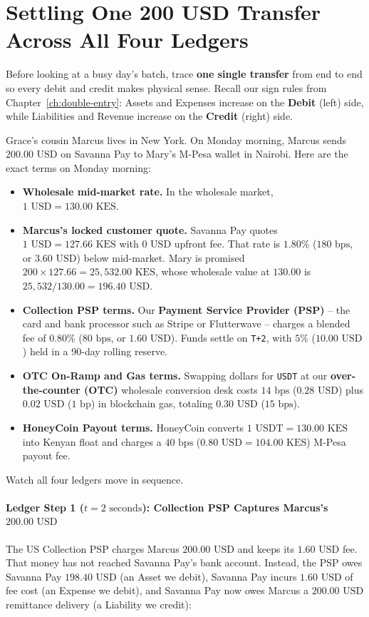 \section{Settling One 200 USD Transfer Across All Four Ledgers}

Before looking at a busy day's batch, trace \textbf{one single transfer} from end to end so every debit and credit makes physical sense. Recall our sign rules from Chapter~\ref{ch:double-entry}: Assets and Expenses increase on the \textbf{Debit} (left) side, while Liabilities and Revenue increase on the \textbf{Credit} (right) side.

Grace's cousin Marcus lives in New York. On Monday morning, Marcus sends $200.00\text{ USD}$ on Savanna Pay to Mary's M-Pesa wallet in Nairobi. Here are the exact terms on Monday morning:
\begin{itemize}
  \item \textbf{Wholesale mid-market rate.} In the wholesale market, $1\text{ USD} = 130.00\text{ KES}$.
  \item \textbf{Marcus's locked customer quote.} Savanna Pay quotes $1\text{ USD} = 127.66\text{ KES}$ with $0\text{ USD}$ upfront fee. That rate is $1.80\%$ ($180\text{ bps}$, or $3.60\text{ USD}$) below mid-market. Mary is promised $200 \times 127.66 = 25{,}532.00\text{ KES}$, whose wholesale value at $130.00$ is $25{,}532 / 130.00 = 196.40\text{ USD}$.
  \item \textbf{Collection PSP terms.} Our \textbf{Payment Service Provider (PSP)} -- the card and bank processor such as Stripe or Flutterwave -- charges a blended fee of $0.80\%$ ($80\text{ bps}$, or $1.60\text{ USD}$). Funds settle on \texttt{T+2}, with $5\%$ ($10.00\text{ USD}$) held in a 90-day rolling reserve.
  \item \textbf{OTC On-Ramp and Gas terms.} Swapping dollars for \texttt{USDT} at our \textbf{over-the-counter (OTC)} wholesale conversion desk costs $14\text{ bps}$ ($0.28\text{ USD}$) plus $0.02\text{ USD}$ ($1\text{ bp}$) in blockchain gas, totaling $0.30\text{ USD}$ ($15\text{ bps}$).
  \item \textbf{HoneyCoin Payout terms.} HoneyCoin converts $1\text{ USDT} = 130.00\text{ KES}$ into Kenyan float and charges a $40\text{ bps}$ ($0.80\text{ USD} = 104.00\text{ KES}$) M-Pesa payout fee.
\end{itemize}

Watch all four ledgers move in sequence.

\paragraph{Ledger Step 1 ($t = 2\text{ seconds}$): Collection PSP Captures Marcus's $200.00\text{ USD}$}
The US Collection PSP charges Marcus $200.00\text{ USD}$ and keeps its $1.60\text{ USD}$ fee. That money has not reached Savanna Pay's bank account. Instead, the PSP owes Savanna Pay $198.40\text{ USD}$ (an Asset we debit), Savanna Pay incurs $1.60\text{ USD}$ of fee cost (an Expense we debit), and Savanna Pay now owes Marcus a $200.00\text{ USD}$ remittance delivery (a Liability we credit):

